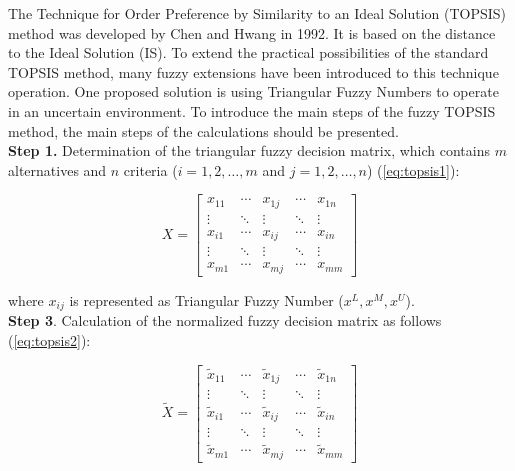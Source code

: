 The Technique for Order Preference by Similarity to an Ideal Solution (TOPSIS) method was developed by Chen and Hwang in 1992. It is based on the distance to the Ideal Solution (IS). To extend the practical possibilities of the standard TOPSIS method, many fuzzy extensions have been introduced to this technique operation. One proposed solution is using Triangular Fuzzy Numbers to operate in an uncertain environment. To introduce the main steps of the fuzzy TOPSIS method, the main steps of the calculations should be presented. \\

\noindent \textbf{Step 1.} Determination of the triangular fuzzy decision matrix, which contains $m$ alternatives and $n$ criteria ($i = 1, 2, \ldots, m$ and $j = 1, 2, \ldots, n$) (\ref{eq:topsis1}):

\begin{equation}
X=\left[\begin{array}{ccccc}
x_{11} & \cdots & x_{1 j} & \cdots & x_{1 n} \\
\vdots & \ddots & \vdots & \ddots & \vdots \\
x_{i 1} & \cdots & x_{i j} & \cdots & x_{i n} \\
\vdots & \ddots & \vdots & \ddots & \vdots \\
x_{m 1} & \cdots & x_{m j} & \cdots & x_{m m}
\end{array}\right]
\label{eq:topsis1}
\end{equation}

\noindent where $x_{ij}$ is represented as Triangular Fuzzy Number ($x^L, x^M, x^U$). \\

\noindent \textbf{Step 3}. Calculation of the normalized fuzzy decision matrix as follows (\ref{eq:topsis2}): 

\begin{equation}
\tilde{X}=\left[\begin{array}{ccccc}
\tilde{x}_{11} & \cdots & \tilde{x}_{1j} & \cdots & \tilde{x}_{1 n} \\
\vdots & \ddots & \vdots & \ddots & \vdots \\
\tilde{x}_{i 1} & \cdots & \tilde{x}_{i j} & \cdots & \tilde{x}_{i n} \\
\vdots & \ddots & \vdots & \ddots & \vdots \\
\tilde{x}_{m 1} & \cdots & \tilde{x}_{m j} & \cdots & \tilde{x}_{m m}
\end{array}\right]
\label{eq:topsis2}
\end{equation}

